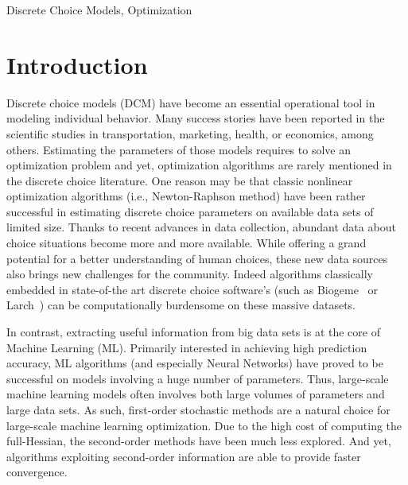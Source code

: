\documentclass[conference]{IEEEtran}
\begin{document}
\begin{IEEEkeywords}
Discrete Choice Models, Optimization
\end{IEEEkeywords}

\section{Introduction}
\label{sec:intro}

Discrete choice models (DCM) have become an essential operational tool in modeling individual behavior. Many success stories have been reported in the scientific studies in transportation, marketing, health, or economics, among others. Estimating the parameters of those models requires to solve an optimization problem and yet, optimization algorithms are rarely mentioned in the discrete choice literature. One reason may be that classic nonlinear optimization algorithms (i.e., Newton-Raphson method) have been rather successful in estimating discrete choice parameters on available data sets of limited size. Thanks to recent advances in data collection, abundant data about choice situations become more and more available. While offering a grand potential for a better understanding of human choices, these new data sources also brings new challenges for the community. Indeed algorithms classically embedded in state-of-the art discrete choice software's (such as Biogeme~\cite{bierlaire_biogeme:_2003} or Larch~\cite{newman_larch:_2016}) can be computationally burdensome on these massive datasets. 

In contrast, extracting useful information from big data sets is at the core of Machine Learning (ML). Primarily interested in achieving high prediction accuracy, ML algorithms (and especially Neural Networks)  have proved to be successful on models involving a huge number of parameters. Thus, large-scale machine learning models often involves both large volumes of parameters and large data sets. As such, first-order stochastic methods are a natural choice for large-scale machine learning optimization.  Due to the high cost of computing the full-Hessian, the second-order methods have been much less explored. And yet, algorithms exploiting second-order information are able to provide faster convergence. 
\end{document}
